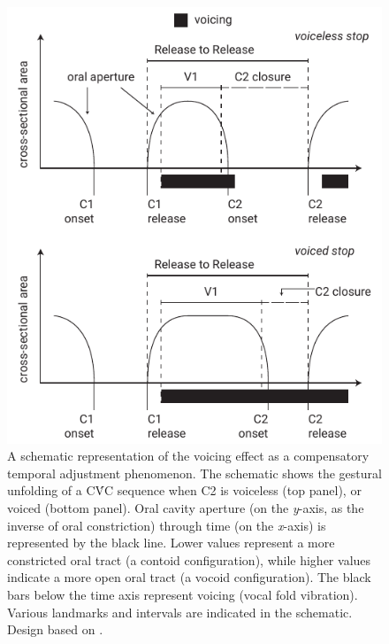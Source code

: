 \documentclass[12pt,]{article}
\begin{document}
\begin{figure}
  \includegraphics{img/Figure6.pdf}
  \caption{A schematic representation of the voicing effect as a compensatory temporal adjustment phenomenon. The schematic shows the gestural unfolding of a CV́C sequence when C2 is voiceless (top panel), or voiced (bottom panel). Oral cavity aperture (on the \textit{y}-axis, as the inverse of oral constriction) through time (on the \textit{x}-axis) is represented by the black line. Lower values represent a more constricted oral tract (a contoid configuration), while higher values indicate a more open oral tract (a vocoid configuration). The black bars below the time axis represent voicing (vocal fold vibration). Various landmarks and intervals are indicated in the schematic. Design based on \citet{esposito2002}.}
  \label{f:compensatory}
\end{figure}
\end{document}
